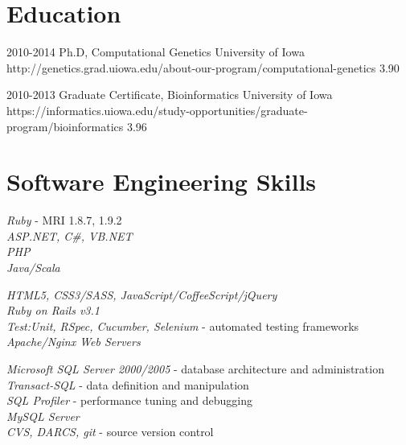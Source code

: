 \documentclass[10pt]{article} %
\begin{document}
\section{Education}

\edu
{2010-2014}
{Ph.D, Computational Genetics}
{University of Iowa}
{http://genetics.grad.uiowa.edu/about-our-program/computational-genetics}
{3.90}


\edu
{2010-2013}
{Graduate Certificate, Bioinformatics}
{University of Iowa}
{https://informatics.uiowa.edu/study-opportunities/graduate-program/bioinformatics}
{3.96}


\section{Software Engineering Skills}

{
\textit{Ruby} - MRI 1.8.7, 1.9.2\\
\textit{ASP.NET, C\#, VB.NET}\\
\textit{PHP}\\
\textit{Java/Scala}
}


{
\textit{HTML5, CSS3/SASS, JavaScript/CoffeeScript/jQuery}\\
\textit{Ruby on Rails v3.1}\\
\textit{Test:Unit, RSpec, Cucumber, Selenium} - automated testing frameworks\\
\textit{Apache/Nginx Web Servers}\\
}


{
\textit{Microsoft SQL Server 2000/2005} - database architecture and administration\\
\textit{Transact-SQL} - data definition and manipulation\\
\textit{SQL Profiler} - performance tuning and debugging\\
\textit{MySQL Server}\\
\textit{CVS, DARCS, git} - source version control
}
\end{document}
